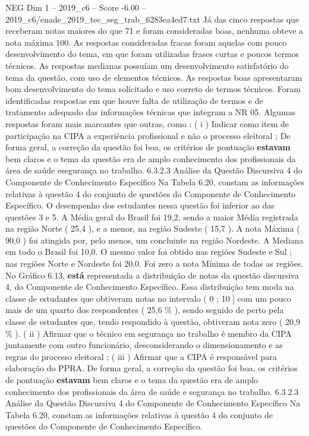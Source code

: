 \begin{textsample}{NEG Dim 1 – 2019\_c6 – Score -6.00 – 2019\_c6/enade\_2019\_tec\_seg\_trab\_6283ea4ed7.txt}
Já das cinco respostas que receberam notas maiores do que 71 e foram consideradas boas, nenhuma obteve a nota máxima 100.
As respostas consideradas fracas foram aquelas com pouco desenvolvimento do tema, em que foram utilizadas frases curtas e poucos termos técnicos.
As respostas medianas possuíam um desenvolvimento satisfatório do tema da questão, com uso de elementos técnicos.
As respostas boas apresentaram bom desenvolvimento do tema solicitado e uso correto de termos técnicos.
Foram identificadas respostas em que houve falta de utilização de termos e de tratamento adequado das informações técnicas que integram a NR 05.
Algumas respostas foram mais marcantes que outras, como : ( i ) Indicar como item de participação na CIPA a experiência profissional e não o processo eleitoral ; De forma geral, a correção da questão foi boa, os critérios de pontuação \textbf{estavam} bem claros e o tema da questão era de amplo conhecimento dos profissionais da área de saúde esegurança no trabalho. 6.3.2.3 Análise da Questão Discursiva 4 do Componente de Conhecimento Específico Na Tabela 6.20, constam as informações relativas à questão 4 do conjunto de questões do Componente de Conhecimento Específico.
O desempenho dos estudantes nessa questão foi inferior ao das questões 3 e 5.
A Média geral do Brasil foi 19,2, sendo a maior Média registrada na região Norte ( 25,4 ), e a menor, na região Sudeste ( 15,7 ).
A nota Máxima ( 90,0 ) foi atingida por, pelo menos, um concluinte na região Nordeste.
A Mediana em todo o Brasil foi 10,0.
O mesmo valor foi obtido nas regiões Sudeste e Sul ; nas regiões Norte e Nordeste foi 20,0.
Foi zero a nota Mínima de todas as regiões.
No Gráfico 6.13, \textbf{está} representada a distribuição de notas da questão discursiva 4, do Componente de Conhecimento Específico.
Essa distribuição tem moda na classe de estudantes que obtiveram notas no intervalo ( 0 ; 10 ] com um pouco mais de um quarto dos respondentes ( 25,6 \% ), sendo seguido de perto pela classe de estudantes que, tendo respondido à questão, obtiveram nota zero ( 20,9 \% ). ( ii ) Afirmar que o técnico em segurança no trabalho é membro da CIPA juntamente com outro funcionário, desconsiderando o dimensionamento e as regras do processo eleitoral ; ( iii ) Afirmar que a CIPA é responsável para elaboração do PPRA.
De forma geral, a correção da questão foi boa, os critérios de pontuação \textbf{estavam} bem claros e o tema da questão era de amplo conhecimento dos profissionais da área de saúde e segurança no trabalho. 6.3.2.3 Análise da Questão Discursiva 4 do Componente de Conhecimento Específico Na Tabela 6.20, constam as informações relativas à questão 4 do conjunto de questões do Componente de Conhecimento Específico.

\end{textsample}
